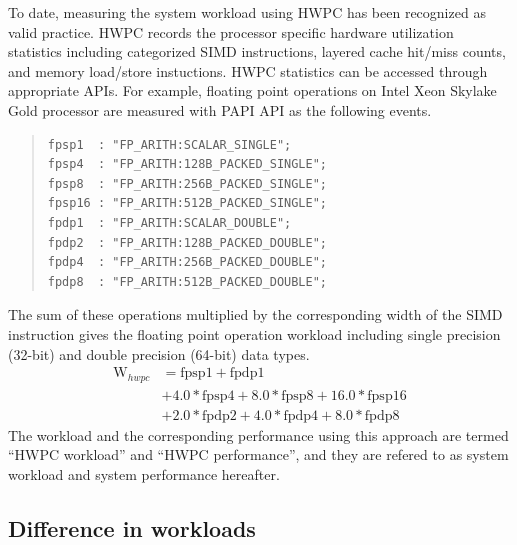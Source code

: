 \documentclass[conference]{IEEEtran}
\begin{document}
To date, measuring the system workload using HWPC has been recognized
as valid practice.
HWPC records the processor specific hardware utilization statistics
including categorized SIMD instructions,
layered cache hit/miss counts,
and memory load/store instuctions.
HWPC statistics can be accessed through appropriate APIs.
For example, floating point operations on
Intel Xeon Skylake Gold processor %
are measured with PAPI API as the following events.
\vspace{1mm}
\begin{quote}
\begin{small}
\begin{verbatim}
fpsp1  : "FP_ARITH:SCALAR_SINGLE";
fpsp4  : "FP_ARITH:128B_PACKED_SINGLE";
fpsp8  : "FP_ARITH:256B_PACKED_SINGLE";
fpsp16 : "FP_ARITH:512B_PACKED_SINGLE";
fpdp1  : "FP_ARITH:SCALAR_DOUBLE";
fpdp2  : "FP_ARITH:128B_PACKED_DOUBLE";
fpdp4  : "FP_ARITH:256B_PACKED_DOUBLE";
fpdp8  : "FP_ARITH:512B_PACKED_DOUBLE";
\end{verbatim}
\end{small}
\end{quote}
\vspace{1mm}
The sum of these operations multiplied by the corresponding width
of the SIMD instruction gives the floating point operation workload
including single precision (32-bit) and double precision (64-bit) data types.
\begin{align}
	\mathrm{W}_{hwpc} & = \mathrm{fpsp1} + \mathrm{fpdp1} \nonumber \\
			& + 4.0*\mathrm{fpsp4} + 8.0*\mathrm{fpsp8} + 16.0*\mathrm{fpsp16} \nonumber \\
			& + 2.0*\mathrm{fpdp2} + 4.0*\mathrm{fpdp4} + 8.0*\mathrm{fpdp8}
\end{align}
%
The workload and the corresponding performance using this approach are termed
``HWPC workload'' and  ``HWPC performance'',
and they are refered to as system workload and system performance hereafter.

%
\subsection{Difference in workloads}
\label{subsection:difference-in-workloads}
\end{document}
